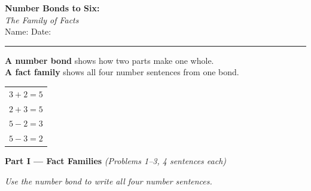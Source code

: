 \documentclass[12pt, letterpaper]{article}
\newcommand{\answerline}{\underline{\hspace{2.5cm}}}
\newcommand{\biganswerline}{\underline{\hspace{4cm}}}
\begin{document}
\begin{center}
  {\LARGE\textbf{\textcolor{scholared}{Number Bonds to Six:}}}\\[4pt]
  {\Large\textcolor{scholagold}{\textit{The Family of Facts}}}\\[6pt]
  {\small Name: \biganswerline \hspace{1cm} Date: \answerline}
\end{center}

\vspace{4pt}
\noindent\textcolor{scholared}{\rule{\linewidth}{1pt}}
\vspace{4pt}


\begin{lessonbox}
\textbf{A number bond} shows how two parts make one whole.\\
\textbf{A fact family} shows all four number sentences from one bond.\\[6pt]
\noindent
{}
\hspace{1cm}
\begin{tabular}{@{}l@{}}
$3 + 2 = 5$ \\
$2 + 3 = 5$ \\
$5 - 2 = 3$ \\
$5 - 3 = 2$
\end{tabular}
\end{lessonbox}

\bigskip

\noindent\textcolor{scholared}{\large\textbf{Part I — Fact Families}} \hfill \textit{(Problems 1–3, 4 sentences each)}

\medskip
\noindent\textit{Use the number bond to write all four number sentences.}
\end{document}
